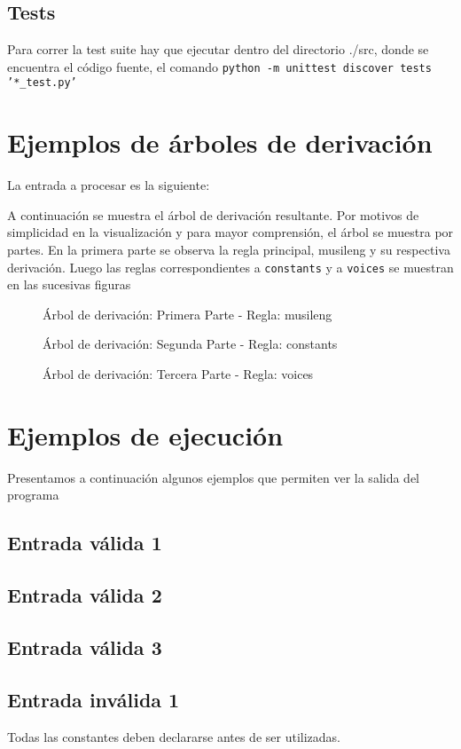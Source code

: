 \documentclass[a4paper,8pt]{article}
\newcommand{\ponerGrafico}[4]
{\begin{figure}[H]
	\centering
	\subfloat{\texttt{[image: \#1]}}
	\caption{#2} \label{fig:#4}
\end{figure}
}
\begin{document}
\subsection{Tests}
Para correr la test suite hay que ejecutar dentro del directorio ./src, donde se encuentra el código fuente, el comando  \texttt{python -m unittest discover tests '*\_test.py'}

\newpage
\section{Ejemplos de árboles de derivación}
La entrada a procesar es la siguiente: 
\begin{small}
  
\end{small}

A continuación se muestra el árbol de derivación resultante. Por motivos de simplicidad en la visualización y para mayor comprensión, el árbol se muestra por partes. En la primera parte se observa la regla principal, musileng y su respectiva derivación. Luego las reglas correspondientes a \texttt{constants} y a \texttt{voices} se muestran en las sucesivas figuras
\ponerGrafico{tree1_musileng.png}{Árbol de derivación: Primera Parte - Regla: musileng}{0.8}{}
\ponerGrafico{tree1_constants.png}{Árbol de derivación: Segunda Parte - Regla: constants}{0.9}{}
\ponerGrafico{tree1_voices.png}{Árbol de derivación: Tercera Parte - Regla: voices}{0.8}{}

\section{Ejemplos de ejecución}
Presentamos a continuación algunos ejemplos que permiten ver la salida del programa
\subsection{Entrada válida 1}
\subsection{Entrada válida 2}
\subsection{Entrada válida 3}
\subsection{Entrada inválida 1}
Todas las constantes deben declararse antes de ser utilizadas.
\begin{small}
  
\end{small}
\end{document}
